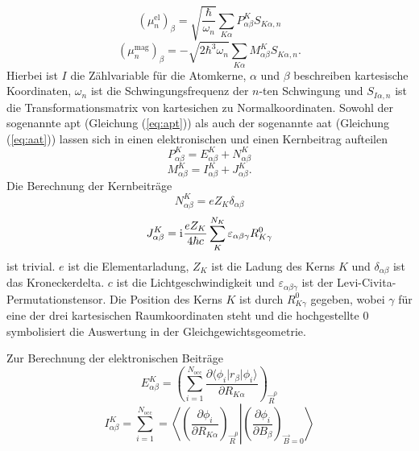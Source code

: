 	\begin{equation}
	  (\mu_n^{\text{el}})_\beta=\sqrt{\frac{\hbar}{\omega_n}}\sum_{K\alpha}P_{\alpha\beta}^K S_{K\alpha,n}
	\end{equation}
	\begin{equation}
	  (\mu_n^{\text{mag}})_\beta=-\sqrt{2\hbar^3\omega_n}\sum_{K\alpha}M_{\alpha\beta}^KS_{K\alpha,n}.
	\end{equation}
	Hierbei ist $I$ die Zählvariable für die Atomkerne, $\alpha$ und $\beta$ beschreiben kartesische Koordinaten, $\omega_n$ ist die Schwingungsfrequenz der $n$-ten Schwingung und $S_{I\alpha,n}$ ist die Transformationsmatrix von kartesichen zu Normalkoordinaten. Sowohl der sogenannte \ac{apt} (Gleichung (\ref{eq:apt})) als auch der sogenannte \ac{aat} (Gleichung (\ref{eq:aat})) lassen sich in einen elektronischen und einen Kernbeitrag aufteilen
	\begin{equation}\label{eq:apt}
	  P^K_{\alpha\beta}=E^K_{\alpha\beta}+N^K_{\alpha\beta}
	\end{equation}
	\begin{equation}\label{eq:aat}
   	  M^K_{\alpha\beta}=I^K_{\alpha\beta}+J^K_{\alpha\beta}.
	\end{equation}
	Die Berechnung der Kernbeiträge 
	\begin{equation}
	  N^K_{\alpha\beta}=eZ_K\delta_{\alpha\beta}
	\end{equation}
	\begin{equation}
	  J^K_{\alpha\beta}=\mathrm{i}\mkern1mu\frac{eZ_K}{4\hbar c}\sum_K^{N_K}\varepsilon_{\alpha\beta\gamma}R^0_{K\gamma}
	\end{equation}
	ist trivial. $e$ ist die Elementarladung, $Z_K$ ist die Ladung des Kerns $K$ und $\delta_{\alpha\beta}$ ist das Kroneckerdelta. $c$ ist die Lichtgeschwindigkeit und $\varepsilon_{\alpha\beta\gamma}$ ist der Levi-Civita-Permutationstensor. Die Position des Kerns $K$ ist durch $R^0_{K\gamma}$ gegeben, wobei $\gamma$ für eine der drei kartesischen Raumkoordinaten steht und die hochgestellte $0$ symbolisiert die Auswertung in der Gleichgewichtsgeometrie.   
	
    Zur Berechnung der elektronischen Beiträge 
    \begin{equation}
      E^K_{\alpha\beta}=\left(\sum_{i=1}^{N_{\text{occ}}}\frac{\partial \langle\phi_i\vert r_\beta\vert\phi_i\rangle}{\partial R_{K\alpha}}\right)_{\vec{R}^0}
    \end{equation}
    \begin{equation}\label{eq:vcdaatel}
      I^K_{\alpha\beta}=\sum_{i=1}^{N_{\text{occ}}}=\left\langle\left.\left(\frac{\partial \phi_i}{\partial R_{K\alpha}}\right)_{\vec{R}^0}\right|\left(\frac{\partial \phi_i}{\partial B_\beta}\right)_{\vec{B}=0}\right\rangle
    \end{equation}
    
